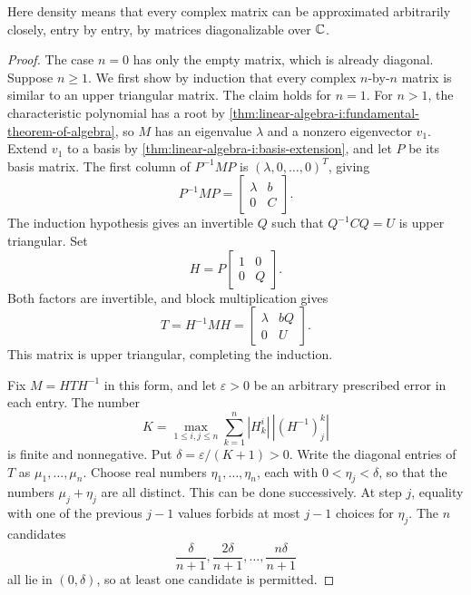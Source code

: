 Here density means that every complex matrix can be approximated
arbitrarily closely, entry by entry, by matrices diagonalizable over
\(\mathbb{C}\).
\begin{pendingreview}
\begin{proof}
  The case \(n=0\) has only the empty matrix, which is already diagonal.
  Suppose \(n\ge1\). We first show by induction that every complex
  \(n\)-by-\(n\) matrix is similar to an upper triangular matrix.
  The claim holds for \(n=1\). For \(n>1\), the characteristic
  polynomial has a root by
  \autoref{thm:linear-algebra-i:fundamental-theorem-of-algebra}, so
  \(M\) has an eigenvalue \(\lambda\) and a nonzero eigenvector
  \(v_1\). Extend \(v_1\) to a basis by
  \autoref{thm:linear-algebra-i:basis-extension}, and let \(P\) be
  its basis matrix. The first column of \(P^{-1}MP\) is
  \((\lambda,0,\ldots,0)^T\), giving
  \[
    P^{-1}MP=\begin{bmatrix}\lambda&b\\0&C\end{bmatrix}.
  \]
  The induction hypothesis gives an invertible \(Q\) such that
  \(Q^{-1}CQ=U\) is upper triangular. Set
  \[
    H=P\begin{bmatrix}1&0\\0&Q\end{bmatrix}.
  \]
  Both factors are invertible, and block multiplication gives
  \[
    T=H^{-1}MH=\begin{bmatrix}\lambda&bQ\\0&U\end{bmatrix}.
  \]
  This matrix is upper triangular, completing the induction.

  Fix \(M=HTH^{-1}\) in this form, and let \(\varepsilon>0\)
  be an arbitrary prescribed error in each entry. The number
  \[
    K=\max_{1\le i,j\le n}
      \sum_{k=1}^n |H^i_k|\,|(H^{-1})^k_j|
  \]
  is finite and nonnegative. Put \(\delta=\varepsilon/(K+1)>0\).
  Write the diagonal entries of \(T\) as \(\mu_1,\ldots,\mu_n\).
  Choose real numbers \(\eta_1,\ldots,\eta_n\), each with
  \(0<\eta_j<\delta\), so that the numbers \(\mu_j+\eta_j\)
  are all distinct. This can be done successively. At step \(j\),
  equality with one of the previous \(j-1\) values forbids at most
  \(j-1\) choices for \(\eta_j\). The \(n\) candidates
  \[
    \frac{\delta}{n+1},\frac{2\delta}{n+1},\ldots,
      \frac{n\delta}{n+1}
  \]
  all lie in \((0,\delta)\), so at least one candidate is permitted.


\end{proof}
\end{pendingreview}
